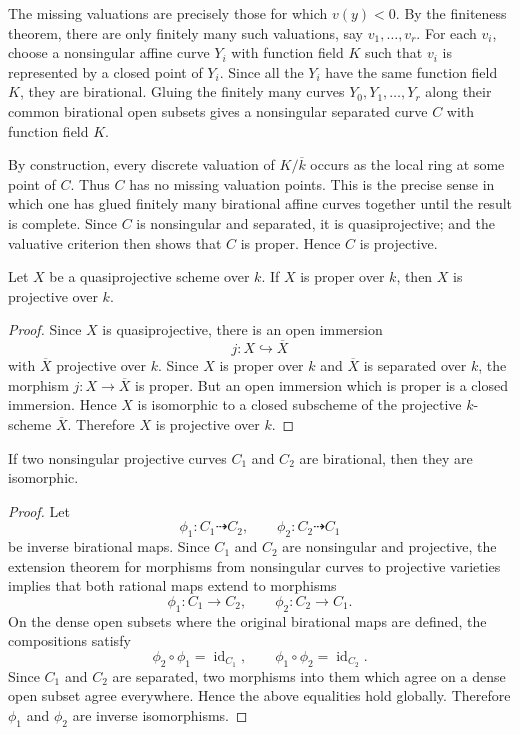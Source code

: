 \documentclass[12pt]{article}
\begin{document}
The missing valuations are precisely those for which $v(y)<0$. By the finiteness theorem, there are only finitely many such valuations, say $v_1,\dots,v_r$. For each $v_i$, choose a nonsingular affine curve $Y_i$ with function field $K$ such that $v_i$ is represented by a closed point of $Y_i$. Since all the $Y_i$ have the same function field $K$, they are birational. Gluing the finitely many curves $Y_0,Y_1,\dots,Y_r$ along their common birational open subsets gives a nonsingular separated curve $C$ with function field $K$.

By construction, every discrete valuation of $K/\overline{k}$ occurs as the local ring at some point of $C$. Thus $C$ has no missing valuation points. This is the precise sense in which one has glued finitely many birational affine curves together until the result is complete. Since $C$ is nonsingular and separated, it is quasiprojective; and the valuative criterion then shows that $C$ is proper. Hence $C$ is projective.
\begin{lemma}
    Let $X$ be a quasiprojective scheme over $k$. If $X$ is proper over $k$, then $X$ is projective over $k$.
\end{lemma}

\begin{proof}
    Since $X$ is quasiprojective, there is an open immersion
    \[
        j:X\hookrightarrow \overline X
    \]
    with $\overline X$ projective over $k$. Since $X$ is proper over $k$ and $\overline X$ is separated over $k$, the morphism $j:X\to \overline X$ is proper. But an open immersion which is proper is a closed immersion. Hence $X$ is isomorphic to a closed subscheme of the projective $k$-scheme $\overline X$. Therefore $X$ is projective over $k$.
\end{proof}

\begin{proposition}
    If two nonsingular projective curves $C_1$ and $C_2$ are birational, then they are isomorphic.
\end{proposition}

\begin{proof}
    Let
    \[
        \phi_1:C_1\dashrightarrow C_2,
        \qquad
        \phi_2:C_2\dashrightarrow C_1
    \]
    be inverse birational maps. Since $C_1$ and $C_2$ are nonsingular and projective, the extension theorem for morphisms from nonsingular curves to projective varieties implies that both rational maps extend to morphisms
    \[
        \phi_1:C_1\to C_2,
        \qquad
        \phi_2:C_2\to C_1.
    \]
    On the dense open subsets where the original birational maps are defined, the compositions satisfy
    \[
        \phi_2\circ \phi_1=\operatorname{id}_{C_1},
        \qquad
        \phi_1\circ \phi_2=\operatorname{id}_{C_2}.
    \]
    Since $C_1$ and $C_2$ are separated, two morphisms into them which agree on a dense open subset agree everywhere. Hence the above equalities hold globally. Therefore $\phi_1$ and $\phi_2$ are inverse isomorphisms.
\end{proof}
\end{document}
